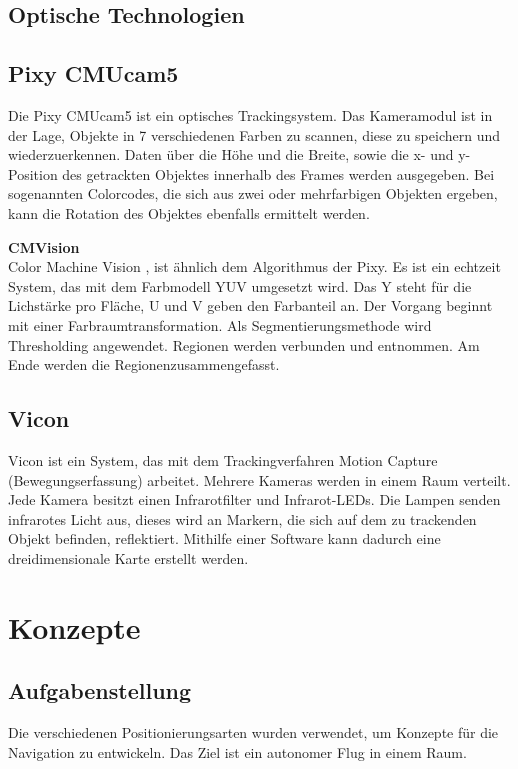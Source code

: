     \subsection{Optische Technologien}
    \subsection*{Pixy CMUcam5}
    Die Pixy CMUcam5\cite{Pixy} ist ein optisches Trackingsystem. Das Kameramodul ist in der Lage, Objekte in 7 verschiedenen Farben zu scannen, diese zu speichern und wiederzuerkennen. Daten über die Höhe und die Breite, sowie die x- und y-Position des getrackten Objektes innerhalb des Frames werden ausgegeben. Bei sogenannten Colorcodes, die sich aus zwei oder mehrfarbigen Objekten ergeben, kann die Rotation des Objektes ebenfalls ermittelt werden.

    \textbf{CMVision}\\
    Color Machine Vision\cite{Pixy_Verfahren} \cite{Pixy_Verfahren2}, ist ähnlich dem Algorithmus der Pixy. Es ist ein echtzeit System, das mit dem Farbmodell YUV umgesetzt wird. Das Y steht für die Lichstärke pro Fläche, U und V geben den Farbanteil an. Der Vorgang beginnt mit einer Farbraumtransformation. Als Segmentierungsmethode wird Thresholding angewendet. Regionen werden verbunden und entnommen. Am Ende werden die Regionenzusammengefasst.  

    \subsection*{Vicon}
    Vicon\cite{Vicon} ist ein System, das mit dem Trackingverfahren Motion Capture (Bewegungserfassung) arbeitet.
    Mehrere Kameras werden in einem Raum verteilt. Jede Kamera besitzt einen Infrarotfilter und Infrarot-LEDs. Die Lampen senden infrarotes Licht aus, dieses wird an Markern, die sich auf dem zu trackenden Objekt befinden, reflektiert. Mithilfe einer Software kann dadurch eine dreidimensionale Karte erstellt werden.
    

  \section{Konzepte}

    \subsection{Aufgabenstellung}
    Die verschiedenen Positionierungsarten wurden verwendet, um Konzepte für die Navigation zu entwickeln. Das Ziel ist ein autonomer Flug in einem Raum.

